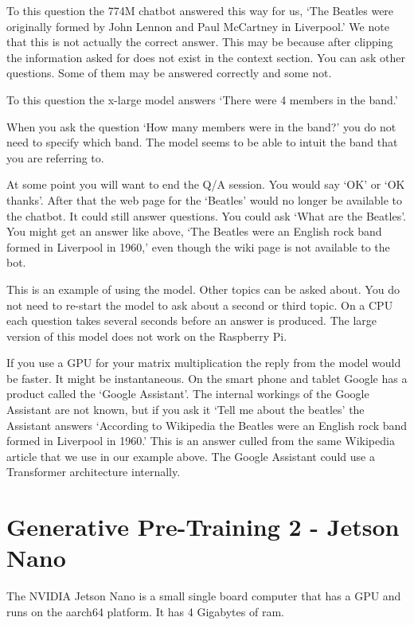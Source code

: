 To this question the 774M chatbot answered this way for us, `The Beatles were originally formed by John Lennon and Paul McCartney in Liverpool.' We note that this is not actually the correct answer. This may be because after clipping the information asked for does not exist in the context section. You can ask other questions. Some of them may be answered correctly and some not. 

To this question the x-large model answers `There were 4 members in the band.'

When you ask the question `How many members were in the band?' you do not need to specify which band. The model seems to be able to intuit the band that you are referring to.

At some point you will want to end the Q/A session. You would say `OK' or `OK thanks'. After that the web page for the `Beatles' would no longer be available to the chatbot. It could still answer questions. You could ask `What are the Beatles'. You might get an answer like above, `The Beatles were an English rock band formed in Liverpool in 1960,' even though the wiki page is not available to the bot.

This is an example of using the model. Other topics can be asked about. You do not need to re-start the model to ask about a second or third topic. On a CPU each question takes several seconds before an answer is produced. The large version of this model does not work on the Raspberry Pi.

If you use a GPU for your matrix multiplication the reply from the model would be faster. It might be instantaneous. On the smart phone and tablet Google has a product called the `Google Assistant'. The internal workings of the Google Assistant are not known, but if you ask it `Tell me about the beatles' the Assistant answers `According to Wikipedia the Beatles were an English rock band formed in Liverpool in 1960.' This is an answer culled from the same Wikipedia article that we use in our example above. The Google Assistant could use a Transformer architecture internally.

\label{chapter-xlarge}

\section{Generative Pre-Training 2 - Jetson Nano}

\label{chapter-nano}
The NVIDIA Jetson Nano is a small single board computer that has a GPU and runs on the aarch64 platform. It has 4 Gigabytes of ram.

